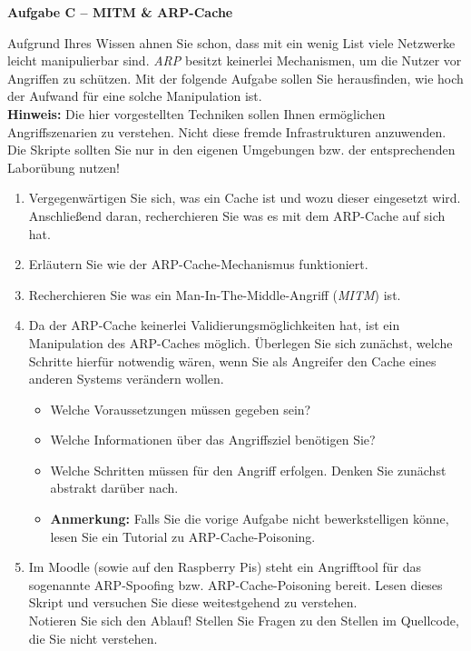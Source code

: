 \documentclass[paper=a4,fontsize=11pt]{scrartcl}%
\numberwithin{equation}{section}
\begin{document}
\begin{center}\Large{\textbf{Aufgabe C -- MITM \& ARP-Cache}}\end{center}\vskip0.25in
Aufgrund Ihres Wissen ahnen Sie schon, dass mit ein wenig List viele Netzwerke leicht manipulierbar sind. \emph{ARP} besitzt keinerlei Mechanismen, um die Nutzer vor Angriffen zu schützen. Mit der folgende Aufgabe sollen Sie herausfinden, wie hoch der Aufwand für eine solche Manipulation ist.\\
\textbf{Hinweis:} Die hier vorgestellten Techniken sollen Ihnen ermöglichen Angriffszenarien zu verstehen. Nicht diese fremde Infrastrukturen anzuwenden. Die Skripte sollten Sie nur in den eigenen Umgebungen bzw. der entsprechenden Laborübung nutzen! 
\begin{enumerate}
	\item Vergegenwärtigen Sie sich, was ein Cache ist und wozu dieser eingesetzt wird. Anschließend daran, recherchieren Sie was es mit dem ARP-Cache auf sich hat.
	\item Erläutern Sie wie der ARP-Cache-Mechanismus funktioniert.
	\item Recherchieren Sie was ein Man-In-The-Middle-Angriff (\emph{MITM}) ist.
	\item Da der ARP-Cache keinerlei Validierungsmöglichkeiten hat, ist ein Manipulation des ARP-Caches möglich. Überlegen Sie sich zunächst, welche Schritte hierfür notwendig wären, wenn Sie als Angreifer den Cache eines anderen Systems verändern wollen.
	\begin{itemize}
		\item Welche Voraussetzungen müssen gegeben sein?
		\item Welche Informationen über das Angriffsziel benötigen Sie?
		\item Welche Schritten müssen für den Angriff erfolgen. Denken Sie zunächst abstrakt darüber nach. 
		\item \textbf{Anmerkung:} Falls Sie die vorige Aufgabe nicht bewerkstelligen könne, lesen Sie ein Tutorial zu ARP-Cache-Poisoning.
	\end{itemize}
	\item Im Moodle (sowie auf den Raspberry Pis) steht ein Angrifftool für das sogenannte ARP-Spoofing bzw. ARP-Cache-Poisoning bereit. Lesen dieses Skript und versuchen Sie diese weitestgehend zu verstehen.\\
	Notieren Sie sich den Ablauf! Stellen Sie Fragen zu den Stellen im Quellcode, die Sie nicht verstehen.
\end{enumerate}
\end{document}
